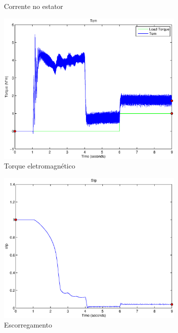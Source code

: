 \documentclass{article}
\begin{document}
\begin{figure}[H]
\begin{subfigure}[b]{0.49\linewidth}
		\caption{Corrente no estator}
	\end{subfigure}
	\begin{subfigure}[b]{0.49\linewidth}
		\centering
		\includegraphics[width=\linewidth]{matlab/tem2}
		\caption{Torque eletromagnético}
	\end{subfigure}
	\begin{subfigure}[b]{0.49\linewidth}
		\centering
		\includegraphics[width=\linewidth]{matlab/slip2}
		\caption{Escorregamento}
	\end{subfigure}
	\begin{subfigure}[b]{0.49\linewidth}

\end{subfigure}
\end{figure}
\end{document}
